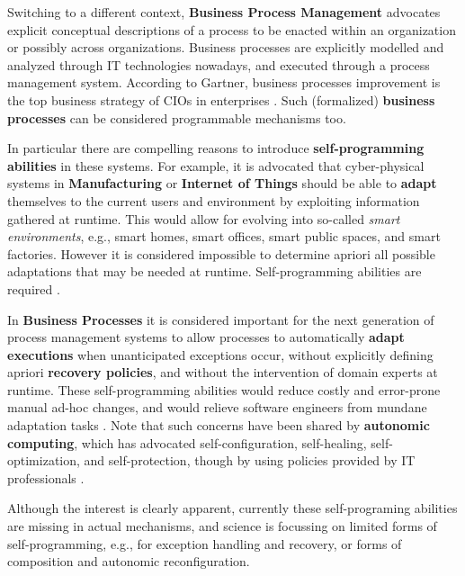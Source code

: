Switching to a different context, \textbf{Business Process Management}
\cite{BPMN-book} advocates explicit conceptual descriptions of a
process to be enacted within an organization or possibly across
organizations. Business processes are explicitly modelled and analyzed
through IT technologies nowadays, and executed through a process
management system. According to Gartner, business processes
improvement is the top business strategy of CIOs in enterprises
\cite{Gartner11}. Such (formalized) \textbf{business processes} can be
considered programmable mechanisms too.

In particular there are compelling reasons to introduce \textbf{self-programming
abilities} in these systems.
For example, it is advocated that cyber-physical systems in
\textbf{Manufacturing} or \textbf{Internet of Things} should be able
to \textbf{adapt} themselves to the current users and environment by
exploiting information gathered at runtime. This would allow for
evolving into so-called \emph{smart environments}, e.g., smart homes,
smart offices, smart public spaces, and smart factories. However it is
considered impossible to determine apriori all possible adaptations
that may be needed at runtime. Self-programming abilities are required
\cite{Seiger2016}.

In \textbf{Business Processes} it is considered important for the next generation
of process management systems to allow processes to automatically
\textbf{adapt executions} when unanticipated exceptions occur, without
explicitly defining apriori \textbf{recovery policies}, and without the
intervention of domain experts at runtime. These self-programming
abilities would reduce costly and error-prone manual ad-hoc changes, and would relieve
software engineers from mundane adaptation
tasks \cite{MarrellaMS17}.  
Note that such concerns have been shared by
\textbf{autonomic computing}, which has advocated self-configuration, self-healing, self-optimization, and self-protection, though by using policies provided by
IT professionals \cite{ibm2005autonomic}.

Although the interest is clearly apparent, currently these
self-programing abilities are missing in actual mechanisms, and
science is focussing on limited forms  of self-programming, e.g., for
exception handling and recovery, or forms of composition and 
autonomic reconfiguration.

